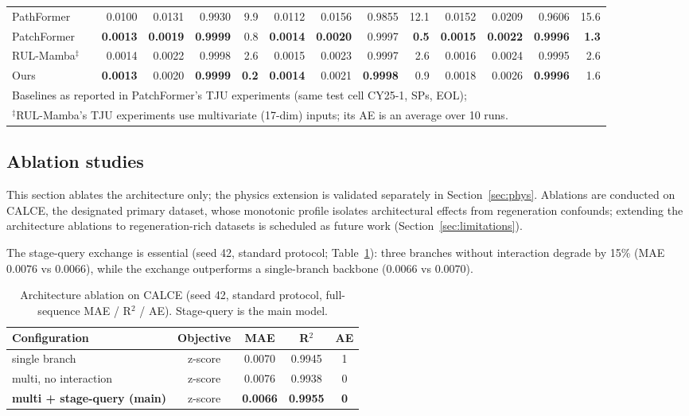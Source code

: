 \begin{table}[htbp]
{\begin{tabular}{ll rrrr rrrr rrrr}
PathFormer & & 0.0100 & 0.0131 & 0.9930 & 9.9 & 0.0112 & 0.0156 & 0.9855 & 12.1 & 0.0152 & 0.0209 & 0.9606 & 15.6 \\
PatchFormer & & \textbf{0.0013} & \textbf{0.0019} & \textbf{0.9999} & 0.8 & \textbf{0.0014} & \textbf{0.0020} & 0.9997 & \textbf{0.5} & \textbf{0.0015} & \textbf{0.0022} & \textbf{0.9996} & \textbf{1.3} \\
RUL-Mamba$^{\ddagger}$ & & 0.0014 & 0.0022 & 0.9998 & 2.6 & 0.0015 & 0.0023 & 0.9997 & 2.6 & 0.0016 & 0.0024 & 0.9995 & 2.6 \\
Ours & & \textbf{0.0013} & 0.0020 & \textbf{0.9999} & \textbf{0.2} & \textbf{0.0014} & 0.0021 & \textbf{0.9998} & 0.9 & 0.0018 & 0.0026 & \textbf{0.9996} & 1.6 \\
\bottomrule
\multicolumn{14}{l}{\footnotesize Baselines as reported in PatchFormer's TJU experiments (same test cell CY25-1, SPs, EOL);}\\
\multicolumn{14}{l}{\footnotesize $^\ddagger$RUL-Mamba's TJU experiments use multivariate (17-dim) inputs; its AE is an average over 10 runs.}\\
\end{tabular}%
}
\end{table}



\subsection{Ablation studies}
\label{sec:ablation}

This section ablates the architecture only; the physics extension is
validated separately in Section~\ref{sec:phys}. Ablations are
conducted on CALCE, the designated primary dataset, whose monotonic
profile isolates architectural effects from regeneration confounds;
extending the architecture ablations to regeneration-rich datasets
is scheduled as future work (Section~\ref{sec:limitations}).

The stage-query exchange is essential (seed 42, standard protocol;
Table~\ref{tab:ablation}): three branches without interaction
degrade by 15\% (MAE $0.0076$ vs $0.0066$), while the exchange
outperforms a single-branch backbone ($0.0066$ vs $0.0070$).
\begin{table}[htbp]
\centering
\caption{Architecture ablation on CALCE (seed 42, standard protocol,
full-sequence MAE / R$^2$ / AE). Stage-query is the main model.}
\label{tab:ablation}
\footnotesize
\begin{tabular}{lcccc}
\toprule
Configuration & Objective & MAE & R$^2$ & AE \\
\midrule
single branch & z-score & 0.0070 & 0.9945 & 1 \\
multi, no interaction & z-score & 0.0076 & 0.9938 & 0 \\
\textbf{multi + stage-query (main)} & z-score & \textbf{0.0066} & \textbf{0.9955} & \textbf{0} \\
\bottomrule
\end{tabular}
\end{table}

